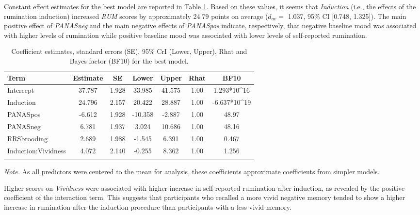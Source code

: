 \documentclass[a4paper,12pt,twoside,openright,oldfontcommands,final]{memoir}
\begin{document}
Constant effect estimates for the best model are reported in Table \ref{tab:paramexp1}. Based on these values, it seems that \emph{Induction} (i.e., the effects of the rumination induction) increased \emph{RUM} scores by approximately 24.79 points on average (\(d_{av} =\) 1.037, 95\% CI {[}0.748, 1.325{]}). The main positive effect of \emph{PANASneg} and the main negative effects of \emph{PANASpos} indicate, respectively, that negative baseline mood was associated with higher levels of rumination while positive baseline mood was associated with lower levels of self-reported rumination.

\begin{table}[H]
\begin{center}
\begin{threeparttable}
\caption{\label{tab:paramexp1}Coefficient estimates, standard errors (SE), 95\% CrI (Lower, Upper), Rhat and Bayes factor (BF10) for the best model.}
\small{
\begin{tabular}{lcccccc}
\toprule
Term & \multicolumn{1}{c}{Estimate} & \multicolumn{1}{c}{SE} & \multicolumn{1}{c}{Lower} & \multicolumn{1}{c}{Upper} & \multicolumn{1}{c}{Rhat} & \multicolumn{1}{c}{BF10}\\
\midrule
Intercept & 37.787 & 1.928 & 33.985 & 41.575 & 1.00 & 1.293*10\textasciicircum{}16\\
Induction & 24.796 & 2.157 & 20.422 & 28.887 & 1.00 & -6.637*10\textasciicircum{}19\\
PANASpos & -6.612 & 1.928 & -10.358 & -2.887 & 1.00 & 48.97\\
PANASneg & 6.781 & 1.937 & 3.024 & 10.686 & 1.00 & 48.16\\
RRSbrooding & 2.689 & 1.988 & -1.545 & 6.391 & 1.00 & 0.467\\
Induction:Vividness & 4.072 & 2.140 & -0.255 & 8.362 & 1.00 & 1.256\\
\bottomrule
\addlinespace
\end{tabular}
}
\begin{tablenotes}[para]
\textit{Note.} As all predictors were centered to the mean for analysis, these coefficients approximate coefficients from simpler models.
\end{tablenotes}
\end{threeparttable}
\end{center}
\end{table}

Higher scores on \emph{Vividness} were associated with higher increase in self-reported rumination after induction, as revealed by the positive coefficient of the interaction term. This suggests that participants who recalled a more vivid negative memory tended to show a higher increase in rumination after the induction procedure than participants with a less vivid memory.
\end{document}
